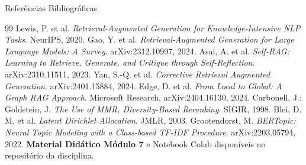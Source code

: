 \documentclass[aspectratio=169]{beamer}
\begin{document}
\begin{frame}[shrink=11]{Referências Bibliográficas}
    \begin{thebibliography}{99}\footnotesize
         Lewis, P. et al. \textit{Retrieval-Augmented Generation for Knowledge-Intensive NLP Tasks}. NeurIPS, 2020.
         Gao, Y. et al. \textit{Retrieval-Augmented Generation for Large Language Models: A Survey}. arXiv:2312.10997, 2024.
         Asai, A. et al. \textit{Self-RAG: Learning to Retrieve, Generate, and Critique through Self-Reflection}. arXiv:2310.11511, 2023.
         Yan, S.-Q. et al. \textit{Corrective Retrieval Augmented Generation}. arXiv:2401.15884, 2024.
         Edge, D. et al. \textit{From Local to Global: A Graph RAG Approach}. Microsoft Research, arXiv:2404.16130, 2024.
         Carbonell, J.; Goldstein, J. \textit{The Use of MMR, Diversity-Based Reranking}. SIGIR, 1998.
         Blei, D. M. et al. \textit{Latent Dirichlet Allocation}. JMLR, 2003.
         Grootendorst, M. \textit{BERTopic: Neural Topic Modeling with a Class-based TF-IDF Procedure}. arXiv:2203.05794, 2022.
         \textbf{Material Didático Módulo 7} e Notebook Colab disponíveis no repositório da disciplina.
    \end{thebibliography}
\end{frame}
\end{document}
